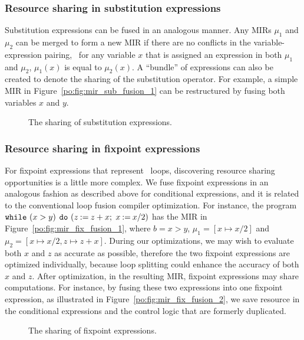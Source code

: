 \subsubsection{Resource sharing in substitution expressions}

Substitution expressions can be fused in an analogous manner.  Any MIRs
$\mu_1$ and $\mu_2$ can be merged to form a new MIR if there are no conflicts
in the variable-expression pairing, \ie~for any variable $x$ that is
assigned an expression in both $\mu_1$ and $\mu_2$, $\mu_1(x)$ is equal
to $\mu_2(x)$.  A ``bundle'' of expressions can also be created to denote
the sharing of the substitution operator.  For example, a simple MIR in
Figure~\ref{po:fig:mir_sub_fusion_1} can be restructured by fusing both
variables $x$ and $y$.
\begin{figure}[ht]
    \centering
    \caption{The sharing of substitution expressions.}
\end{figure}

\subsubsection{Resource sharing in fixpoint expressions}

For fixpoint expressions that represent \whilelit~loops, discovering
resource sharing opportunities is a little more complex.  We fuse
fixpoint expressions in an analogous fashion as described above for
conditional expressions, and it is related to the conventional loop fusion
compiler optimization.  For instance, the program $\texttt{while}~(x > y)$
$\texttt{do}~(z\mathbin{:=}{z + x} \mathbin{;}$ $x\mathbin{:=}{x / 2})$ has the
MIR in Figure~\ref{po:fig:mir_fix_fusion_1}, where $b = x > y$, $\mu_1 = [x
\mapsto x / 2]$ and $\mu_2 = [x \mapsto x / 2, z \mapsto z + x]$.  During
our optimizations, we may wish to evaluate both $x$ and $z$ as accurate as
possible, therefore the two fixpoint expressions are optimized individually,
because loop splitting could enhance the accuracy of both $x$ and $z$.
After optimization, in the resulting MIR, fixpoint expressions may share
computations.  For instance, by fusing these two expressions into one fixpoint
expression, as illustrated in Figure~\ref{po:fig:mir_fix_fusion_2}, we save
resource in the conditional expressions and the control logic that are formerly
duplicated.
\begin{figure}[ht]
    \centering
    \caption{The sharing of fixpoint expressions.}
\end{figure}

